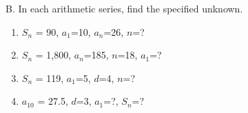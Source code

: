 B. In each arithmetic series, find the specified unknown. 
\begin{enumerate}
\item \hspce $S_{n}$ = 90, $a_{1}$=10, $a_{n}$=26, $n$=? 
\item \hspce $S_{n}$ = 1,800, $a_{n}$=185, $n$=18, $a_{1}$=? 
\item \hspce $S_{n}$ = 119, $a_{1}$=5, $d$=4, $n$=? 
\item \hspce $a_{10}$ = 27.5, $d$=3, $a_{1}$=?, $S_{n}$=?

\end{enumerate}
